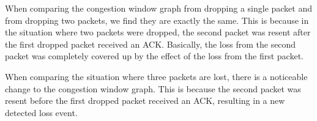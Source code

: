 \documentclass[fleqn,11pt]{article}
\begin{document}
When comparing the congestion window graph from dropping a single packet and from dropping two packets, we find they are exactly the same. This is because in the situation where two packets were dropped, the second packet was resent after the first dropped packet received an ACK. Basically, the loss from the second packet was completely covered up by the effect of the loss from the first packet.

When comparing the situation where three packets are lost, there is a noticeable change to the congestion window graph. This is because the second packet was resent before the first dropped packet received an ACK, resulting in a new detected loss event.
\end{document}
